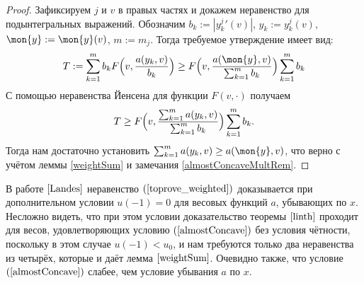 \begin{proof}
Зафиксируем $j$ и $v$ в правых частях и докажем неравенство для подынтегральных выражений.
Обозначим $b_k := |y_k^j{}'(v)|$, $y_k := y_k^j(v)$, $\mon{y} := \mon{y}(v)$, $m := m_j$. Тогда
требуемое утверждение имеет вид:
$$T:=\sum_{k=1}^m b_k F \Bigl( v, \frac{ a(y_k, v) }{b_k} \Bigr) \ge F \Bigl( v, \frac{ a(\mon{y}, v) }{ \sum_{k=1}^m b_k  } \Bigr) \sum_{k=1}^m b_k$$
С помощью неравенства Йенсена для функции $F(v, \cdot)$ получаем
$$T \ge F \Bigl( v, \frac{ \sum_{k=1}^m a(y_k, v) }{ \sum_{k=1}^m b_k } \Bigr) \sum_{k=1}^m b_k.$$
Тогда нам достаточно установить $\sum_{k=1}^m a(y_k, v) \ge a(\mon{y}, v)$, что верно с учётом леммы \ref{weightSum} и замечания
\ref{almostConcaveMultRem}.
\end{proof}

\begin{rem}
\label{landesLinear}
В работе $\cite{Landes}$ неравенство $(\ref{toprove_weighted})$ доказывается при дополнительном условии $u(-1) = 0$
для весовых функций $a$, убывающих по $x$.
Несложно видеть, что при этом условии доказательство теоремы $\ref{linth}$ проходит для весов, удовлетворяющих условию
$(\ref{almostConcave})$ без условия чётности,
поскольку в этом случае $u(-1) < u_0$, и нам требуются только два неравенства из четырёх,
которые и даёт лемма $\ref{weightSum}$.
Очевидно также, что условие $(\ref{almostConcave})$ слабее, чем условие убывания $a$ по $x$.
\end{rem}
